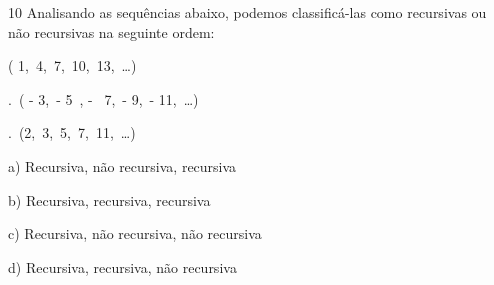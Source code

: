 
\num{10} Analisando as sequências abaixo, podemos classificá-las como
recursivas ou não recursivas na seguinte ordem:

 \; \left( 1,\ 4,\ 7,\ 10,\ 13,\ \ldots \right)

.\ ( - 3,\  - 5\ , - \ 7,\  - 9,\  - 11,\ \ldots)

.\ (2,\ 3,\ 5,\ 7,\ 11,\ \ldots)

a) Recursiva, não recursiva, recursiva

b) Recursiva, recursiva, recursiva

c) Recursiva, não recursiva, não recursiva

d) Recursiva, recursiva, não recursiva



